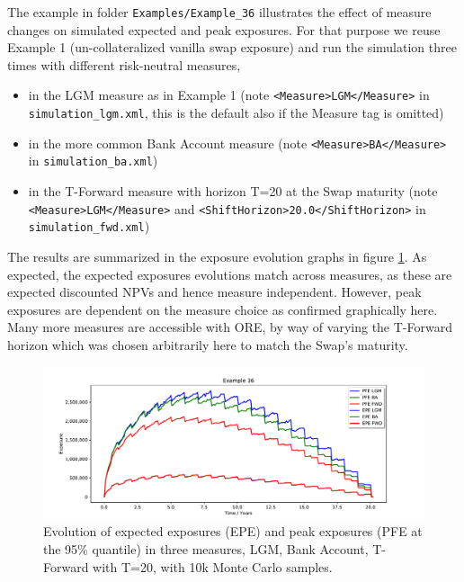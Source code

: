 \documentclass[12pt, a4paper]{article}
\begin{document}
The example in folder {\tt Examples/Example\_36} illustrates the effect of measure changes on simulated expected and peak exposures. For that purpose we reuse Example 1 (un-collateralized vanilla swap exposure) and run the simulation three times with different risk-neutral measures,
\begin{itemize}
\item in the LGM measure as in Example 1 (note {\tt <Measure>LGM</Measure>} in {\tt simulation\_lgm.xml}, this is the default also if the Measure tag is omitted)  
\item in the more common Bank Account measure (note {\tt <Measure>BA</Measure>} in {\tt simulation\_ba.xml})  
\item in the T-Forward measure with horizon T=20 at the Swap maturity (note {\tt <Measure>LGM</Measure>}  and {\tt <ShiftHorizon>20.0</ShiftHorizon>} in {\tt simulation\_fwd.xml})
\end{itemize}

The results are summarized in the exposure evolution graphs in figure \ref{fig:36}. As expected, the expected exposures evolutions match across measures, as these are expected discounted NPVs and hence measure independent.
However, peak exposures are dependent on the measure choice as confirmed graphically here. Many more measures are accessible with ORE, by way of varying the T-Forward horizon which was chosen arbitrarily here to match the Swap's maturity.

\begin{figure}[h!]
\begin{center}
\includegraphics[scale=0.45]{mpl_exposures_measures.pdf}
\end{center}
\caption{Evolution of expected exposures (EPE) and peak exposures (PFE at the 95\% quantile) in three measures, LGM, Bank Account, T-Forward with T=20, with 10k Monte Carlo samples.}
\label{fig:36}
\end{figure}

\end{document}

